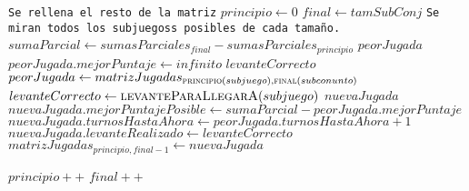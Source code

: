 \documentclass[11pt, a4paper, twoside]{article}
\begin{document}
\begin{algorithm}[H]
\begin{algorithmic}[1]
	\Statex
	\Statex \texttt{Se rellena el resto de la matriz}
							
		\State $principio \gets 0$											
		\State $final \gets tamSubConj$										
		\Statex \hspace{0.37cm} \texttt{Se miran todos los subjuegoss posibles de cada tamaño.} 
												
			\State $sumaParcial \gets sumasParciales_{final} - sumasParciales_{principio}$ 
			\State $peorJugada$												
			\State $peorJugada.mejorPuntaje \gets infinito$					
			\State $levanteCorrecto$										
				 
					\State $peorJugada \gets matrizJugadas_{\Call{principio}{subjuego}, \Call{final}{subconunto}}$ 
					\State $levanteCorrecto \gets \Call{levanteParaLlegarA}{subjuego}$ 
				\EndIf
			\EndFor
			\State $nuevaJugada$											
			\State $nuevaJugada.mejorPuntajePosible \gets sumaParcial - peorJugada.mejorPuntaje$   
			\State $nuevaJugada.turnosHastaAhora \gets peorJugada.turnosHastaAhora +1$   
			\State $nuevaJugada.levanteRealizado \gets levanteCorrecto$		
			\State $matrizJugadas_{principio,final-1} \gets nuevaJugada$	
			
			\State $principio++$											
			\State $final++$												
		\EndWhile
	\EndFor
{}
\end{algorithmic}
\end{algorithm}
\end{document}
